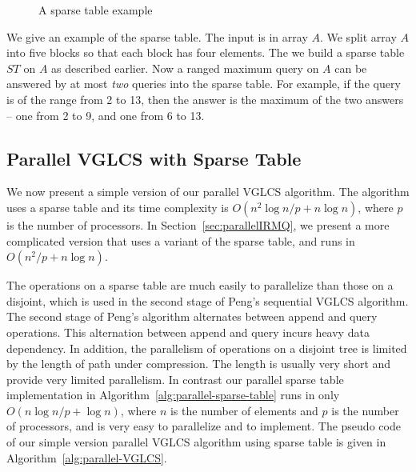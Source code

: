 \begin{figure}[!thb]
  \centering {} 
  \caption{A sparse table example}
  \label{fig:interval-decomposition}
\end{figure}

We give an example of the sparse table.  The input is in array $A$. We
split array $A$ into five blocks so that each block has four elements.
The we build a sparse table $ST$ on $A$ as described earlier.  Now a
ranged maximum query on $A$ can be answered by at most {\em two}
queries into the sparse table.  For example, if the query is of the
range from 2 to 13, then the answer is the maximum of the two answers
-- one from 2 to 9, and one from 6 to 13.

\subsection{Parallel VGLCS with Sparse Table}

We now present a simple version of our parallel VGLCS algorithm.  The
algorithm uses a sparse table and its time complexity is $O(n^2 \log n
/ p + n \log n)$, where $p$ is the number of processors.  In
Section~\ref{sec:parallelIRMQ}, we present a more complicated version
that uses a variant of the sparse table, and runs in $O(n^2 / p + n
\log n)$.



The operations on a sparse table are much easily to parallelize than
those on a disjoint, which is used in the second stage of Peng's
sequential VGLCS algorithm.  The second stage of Peng's algorithm
alternates between append and query operations.  This alternation
between append and query incurs heavy data dependency.  In addition,
the parallelism of operations on a disjoint tree is limited by the
length of path under compression.  The length is usually very short
and provide very limited parallelism.  In contrast our parallel sparse
table implementation in Algorithm~\ref{alg:parallel-sparse-table} runs
in only $O(n \log n / p + \log n)$, where $n$ is the number of
elements and $p$ is the number of processors, and is very easy to
parallelize and to implement.  The pseudo code of our simple version
parallel VGLCS algorithm using sparse table is given in
Algorithm~\ref{alg:parallel-VGLCS}.


